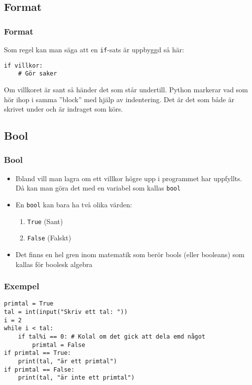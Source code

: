 \documentclass[aspectratio=169]{beamer}
\begin{document}
\subsection{Format}

\begin{frame}[fragile]
	\frametitle{Format}
	
	Som regel kan man säga att en \lstinline{if}-sats är uppbyggd så här:
	
	\begin{lstlisting}
if villkor:
    # Gör saker 
\end{lstlisting}

Om villkoret är sant så händer det som står undertill. Python markerar vad som hör ihop i samma ''block'' med hjälp av indentering. Det är det som både är skrivet under och är indraget som körs.

\end{frame}

\subsection{Bool}

\begin{frame}[fragile]
	\frametitle{Bool}
	
	
	\begin{itemize}
		\item Ibland vill man lagra om ett villkor högre upp i programmet har uppfyllts. Då kan man göra det med en variabel som kallas \lstinline{bool}
		\item En \lstinline{bool} kan bara ha två olika värden:
			\begin{enumerate}
				\item \texttt{True} (Sant)
				\item \texttt{False} (Falskt)
			\end{enumerate}
		\item Det finns en hel gren inom matematik som berör bools (eller booleans) som kallas för boolesk algebra
	\end{itemize}
	
	
\end{frame}

\begin{frame}[fragile]
	\frametitle{Exempel}
	
	\begin{lstlisting}
primtal = True
tal = int(input("Skriv ett tal: "))
i = 2
while i < tal:
    if tal%i == 0: # Kolal om det gick att dela emd något
        primtal = False
if primtal == True:
    print(tal, "är ett primtal")
if primtal == False:
    print(tal, "är inte ett primtal")
	\end{lstlisting}

\end{frame}
\end{document}
